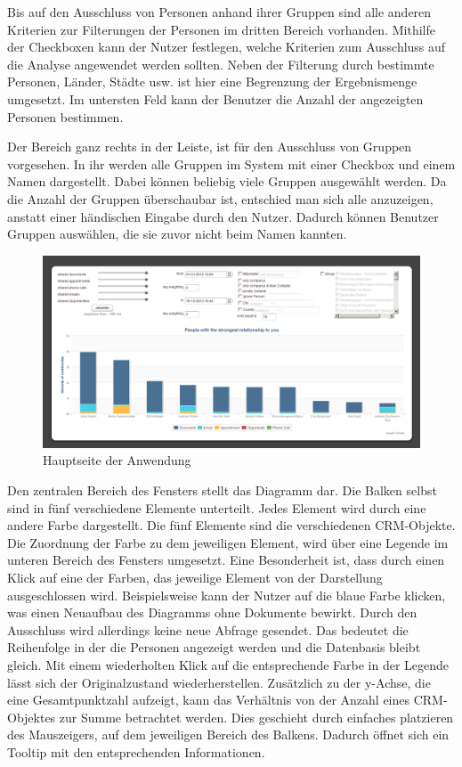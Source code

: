 Bis auf den Ausschluss von Personen anhand ihrer Gruppen sind alle anderen Kriterien zur Filterungen der Personen im dritten Bereich vorhanden. Mithilfe der Checkboxen kann der Nutzer festlegen, welche Kriterien zum Ausschluss auf die Analyse angewendet werden sollten. Neben der Filterung durch bestimmte Personen, Länder, Städte usw. ist hier eine Begrenzung der Ergebnismenge umgesetzt. Im untersten Feld kann der Benutzer die Anzahl der angezeigten Personen bestimmen.

Der Bereich ganz rechts in der Leiste, ist für den Ausschluss von Gruppen vorgesehen. In ihr werden alle Gruppen im System mit einer Checkbox und einem Namen dargestellt. Dabei können beliebig viele Gruppen ausgewählt werden. Da die Anzahl der Gruppen überschaubar ist, entschied man sich alle anzuzeigen, anstatt einer händischen Eingabe durch den Nutzer. Dadurch können Benutzer Gruppen auswählen, die sie zuvor nicht beim Namen kannten.

\begin{figure}[htbp]
\centering
\includegraphics[width=\textwidth]{pics/final_screen.png}
\caption{Hauptseite der Anwendung}
\label{ergebniss_oberflaeche_haupt}
\end{figure}

Den zentralen Bereich des Fensters stellt das Diagramm dar. Die Balken selbst sind in fünf verschiedene Elemente unterteilt. Jedes Element wird durch eine andere Farbe dargestellt. Die fünf Elemente sind die verschiedenen CRM-Objekte. Die Zuordnung der Farbe zu dem jeweiligen Element, wird über eine Legende im unteren Bereich des Fensters umgesetzt. Eine Besonderheit ist, dass durch einen Klick auf eine der Farben, das jeweilige Element von der Darstellung ausgeschlossen wird. Beispielsweise kann der Nutzer auf die blaue Farbe klicken, was einen Neuaufbau des Diagramms ohne Dokumente bewirkt. Durch den Ausschluss wird allerdings keine neue Abfrage gesendet. Das  bedeutet die Reihenfolge in der die Personen angezeigt werden und die Datenbasis bleibt gleich. Mit einem wiederholten Klick auf die entsprechende Farbe in der Legende lässt sich der Originalzustand wiederherstellen. Zusätzlich zu der y-Achse, die eine Gesamtpunktzahl aufzeigt, kann das Verhältnis von der Anzahl eines CRM-Objektes zur Summe betrachtet werden. Dies geschieht durch einfaches platzieren des Mauszeigers, auf dem jeweiligen Bereich des Balkens. Dadurch öffnet sich ein Tooltip mit den entsprechenden Informationen.

